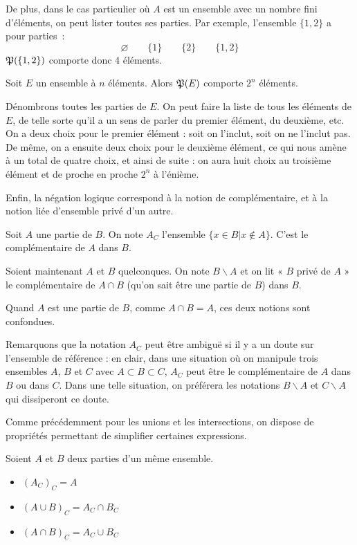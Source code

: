 \newpage
De plus, dans le cas particulier où $A$ est un ensemble avec un nombre fini d'éléments, on peut lister toutes ses parties. Par exemple, l'ensemble $\{1,2\}$ a pour parties~:
\[\varnothing \qquad \{1\} \qquad \{2\} \qquad \{1,2\}\]  
$\mathfrak{P}(\{1,2\})$ comporte donc 4 éléments.

\begin{prop}
    Soit $E$ un ensemble à $n$ éléments. Alors $\mathfrak{P}(E)$ comporte $2^n$ éléments.
\end{prop}
\begin{demo}
    Dénombrons toutes les parties de $E$. On peut faire la liste de tous les éléments de $E$, de telle sorte qu'il a un sens de parler du premier élément, du deuxième, etc. On a deux choix pour le premier élément : soit on l'inclut, soit on ne l'inclut pas. De même, on a ensuite deux choix pour le deuxième élément, ce qui nous amène à un total de quatre choix, et ainsi de suite : on aura huit choix au troisième élément et de proche en proche $2^n$ à l'énième.
\end{demo}

Enfin, la négation logique correspond à la notion de complémentaire, et à la notion liée d'ensemble privé d'un autre.

\begin{defini}
    Soit $A$ une partie de $B$. On note ${A}_C$ l'ensemble $\{x\in B|x\not\in A\}$. C'est le complémentaire de $A$ dans $B$.

\medskip
    Soient maintenant $A$ et $B$ quelconques. On note $B\backslash A$ et on lit « $B$ privé de $A$ » le complémentaire de $A\cap B$ (qu'on sait être une partie de $B$) dans $B$.

\medskip
    Quand $A$ est une partie de $B$, comme $A\cap B = A$, ces deux notions sont confondues.
\end{defini}

Remarquons que la notation $A_C$ peut être ambiguë si il y a un doute sur l'ensemble de référence : en clair, dans une situation où on manipule trois ensembles $A$, $B$ et $C$ avec $A\subset B \subset C$, $A_C$ peut être le complémentaire de $A$ dans $B$ ou dans $C$. Dans une telle situation, on préférera les notations $B\backslash A$ et $C\backslash A$ qui dissiperont ce doute.

\medskip
Comme précédemment pour les unions et les intersections, on dispose de propriétés permettant de simplifier certaines expressions.

\begin{prop}
    Soient $A$ et $B$ deux parties d'un même ensemble.
\begin{itemize}
    \item $(A_C)_C=A$
    \item $(A\cup B)_C= A_C \cap B_C$
    \item $(A\cap B)_C= A_C \cup B_C$
\end{itemize}    
\end{prop}


